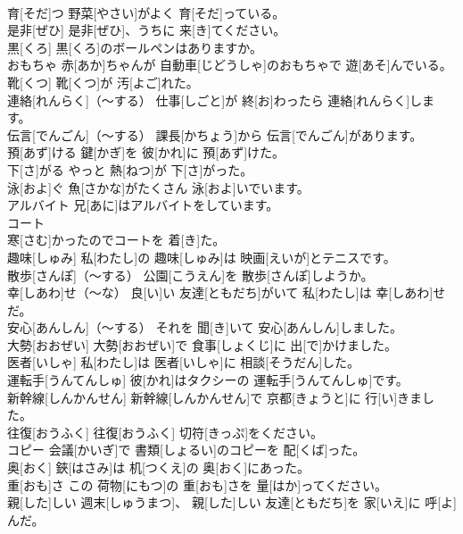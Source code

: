 \documentclass[8pt]{extreport}
\begin{document}
\begin{CJK}{UTF8}{min}
\\	育[そだ]つ	野菜[やさい]がよく 育[そだ]っている。		
\\	是非[ぜひ]	是非[ぜひ]、うちに 来[き]てください。		
\\	黒[くろ]	黒[くろ]のボールペンはありますか。		
\\	おもちゃ	赤[あか]ちゃんが 自動車[じどうしゃ]のおもちゃで 遊[あそ]んでいる。		
\\	靴[くつ]	靴[くつ]が 汚[よご]れた。		
\\	連絡[れんらく]（～する）	仕事[しごと]が 終[お]わったら 連絡[れんらく]します。		
\\	伝言[でんごん]（～する）	課長[かちょう]から 伝言[でんごん]があります。		
\\	預[あず]ける	鍵[かぎ]を 彼[かれ]に 預[あず]けた。		
\\	下[さ]がる	やっと 熱[ねつ]が 下[さ]がった。		
\\	泳[およ]ぐ	魚[さかな]がたくさん 泳[およ]いでいます。		
\\	アルバイト	兄[あに]はアルバイトをしています。		
\\	コート
\\	寒[さむ]かったのでコートを 着[き]た。		
\\	趣味[しゅみ]	私[わたし]の 趣味[しゅみ]は 映画[えいが]とテニスです。		
\\	散歩[さんぽ]（～する）	公園[こうえん]を 散歩[さんぽ]しようか。		
\\	幸[しあわ]せ（～な）	良[い]い 友達[ともだち]がいて 私[わたし]は 幸[しあわ]せだ。		
\\	安心[あんしん]（～する）	それを 聞[き]いて 安心[あんしん]しました。		
\\	大勢[おおぜい]	大勢[おおぜい]で 食事[しょくじ]に 出[で]かけました。		
\\	医者[いしゃ]	私[わたし]は 医者[いしゃ]に 相談[そうだん]した。		
\\	運転手[うんてんしゅ]	彼[かれ]はタクシーの 運転手[うんてんしゅ]です。		
\\	新幹線[しんかんせん]	新幹線[しんかんせん]で 京都[きょうと]に 行[い]きました。		
\\	往復[おうふく]	往復[おうふく] 切符[きっぷ]をください。		
\\	コピー	会議[かいぎ]で 書類[しょるい]のコピーを 配[くば]った。		
\\	奥[おく]	鋏[はさみ]は 机[つくえ]の 奥[おく]にあった。		
\\	重[おも]さ	この 荷物[にもつ]の 重[おも]さを 量[はか]ってください。		
\\	親[した]しい	週末[しゅうまつ]、 親[した]しい 友達[ともだち]を 家[いえ]に 呼[よ]んだ。		

\end{CJK}
\end{document}
